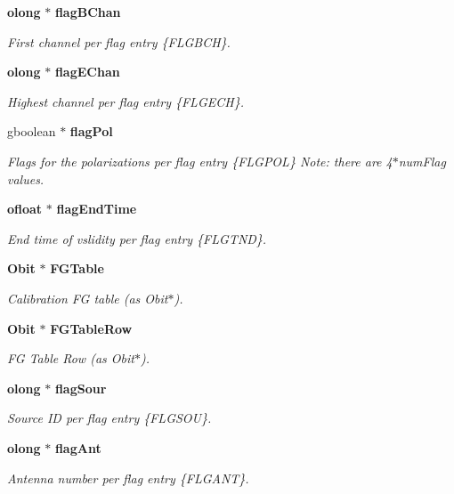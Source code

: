 \begin{CompactItemize}
{\bf olong} $\ast$ {\bf flag\-BChan}
\begin{CompactList}\small\item\em First channel per flag entry \{FLGBCH\}. \item\end{CompactList}\item 
{\bf olong} $\ast$ {\bf flag\-EChan}
\begin{CompactList}\small\item\em Highest channel per flag entry \{FLGECH\}. \item\end{CompactList}\item 
gboolean $\ast$ {\bf flag\-Pol}
\begin{CompactList}\small\item\em Flags for the polarizations per flag entry \{FLGPOL\} Note: there are 4$\ast$num\-Flag values. \item\end{CompactList}\item 
{\bf ofloat} $\ast$ {\bf flag\-End\-Time}
\begin{CompactList}\small\item\em End time of vslidity per flag entry \{FLGTND\}. \item\end{CompactList}\item 
{\bf Obit} $\ast$ {\bf FGTable}
\begin{CompactList}\small\item\em Calibration FG table (as Obit$\ast$). \item\end{CompactList}\item 
{\bf Obit} $\ast$ {\bf FGTable\-Row}
\begin{CompactList}\small\item\em FG Table Row (as Obit$\ast$). \item\end{CompactList}\item 
{\bf olong} $\ast$ {\bf flag\-Sour}
\begin{CompactList}\small\item\em Source ID per flag entry \{FLGSOU\}. \item\end{CompactList}\item 
{\bf olong} $\ast$ {\bf flag\-Ant}
\begin{CompactList}\small\item\em Antenna number per flag entry \{FLGANT\}. \item\end{CompactList}\item 

\end{CompactItemize}
